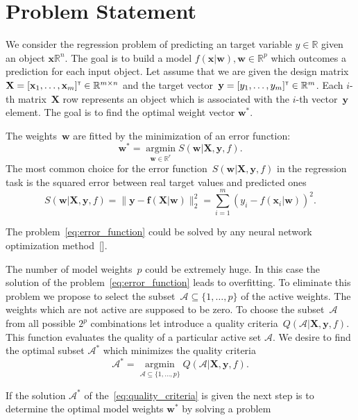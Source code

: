 \documentclass[a4paper,12pt]{article}
\theoremstyle{plain} %
\theoremstyle{definition} %
\theoremstyle{remark} %
\newcommand{\bw}{\mathbf{w}}
\newcommand{\by}{\mathbf{y}}
\newcommand{\bx}{\mathbf{x}}
\newcommand{\cA}{\mathcal{A}}
\newcommand{\bbR}{\mathbb{R}}
\newcommand{\bX}{\mathbf{X}}
\newcommand{\T}{{\text{\tiny\sffamily\upshape\mdseries T}}}
\newcommand{\argmin}{\mathop{\arg \min}\limits}
\begin{document}
		
	\section*{Problem Statement}

	We consider the regression problem of predicting an target variable $y \in \bbR$ given an object $\bx \bbR^{n}$. 
	The goal is to build a model $f(\bx | \bw), \bw \in \mathbb{R}^p$ which outcomes a prediction for each input object.
	Let assume that we are given the design matrix~$\bX = [\bx_1, \dots, \bx_m]^{\T} \in \bbR^{m \times n}$ and the target vector~$\by = [y_1, \dots, y_m]^{\T} \in \bbR^{m}$. 
	Each $i$-th matrix~$\bX$ row represents an object which is associated with the $i$-th vector~$\by$ element.
	The goal is to find the optimal weight vector $\bw^*$.
	
	The weights~$\bw$ are fitted by the minimization of an error function:
	\begin{equation}
	\bw^* = \argmin_{\bw \in \bbR^r} S(\bw | \bX, \by, f).
	\label{eq:error_function}
	\end{equation}
	The most common choice for the error function~$S(\bw | \bX, \by, f)$ in the regression task is the squared error between real target values and predicted ones
	\[
		S(\bw | \bX, \by, f) =  \| \by - \mathbf{f}(\bX | \bw)\|_2^2 = \sum_{i=1}^m (y_i - f(\bx_i | \bw))^2.
	\]

	The problem~\ref{eq:error_function} could be solved by any neural network optimization method~[].
	
	The number of model weights~$p$ could be extremely huge. 
	In this case the solution of the problem~\ref{eq:error_function} leads to overfitting. 
	To eliminate this problem we propose to select the subset~$\cA \subseteq \{1, \dots, p\}$ of the active weights. 
	The weights which are not active are supposed to be zero.
	To choose the subset~$\cA$ from all possible $2^p$ combinations let introduce a quality criteria~$Q(\cA | \bX, \by, f)$. 
	This function evaluates the quality of a particular active set $\cA$. 
	We desire to find the optimal subset $\cA^*$ which minimizes the quality criteria
	\begin{equation}
		\cA^* = \argmin_{\cA \subseteq \{1, \dots, p\}} Q(\cA | \bX, \by, f).
		\label{eq:quality_criteria}
	\end{equation}
	
	If the solution $\cA^*$ of the~\ref{eq:quality_criteria} is given the next step is to determine the optimal model weights	$\bw^*$ by solving a problem
	
\end{document}
